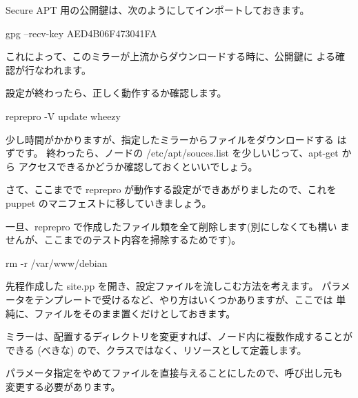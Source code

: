 \documentclass[mingoth,a4paper]{jsarticle}
\begin{document}
Secure APT 用の公開鍵は、次のようにしてインポートしておきます。

\begin{commandline}
gpg --recv-key AED4B06F473041FA
\end{commandline}

これによって、このミラーが上流からダウンロードする時に、公開鍵に
よる確認が行なわれます。

設定が終わったら、正しく動作するか確認します。

\begin{commandline}
reprepro -V update wheezy
\end{commandline}

少し時間がかかりますが、指定したミラーからファイルをダウンロードする
はずです。
終わったら、ノードの /etc/apt/souces.list を少しいじって、apt-get から
アクセスできるかどうか確認しておくといいでしょう。

さて、ここまでで reprepro が動作する設定ができあがりましたので、これを
puppet のマニフェストに移していきましょう。

一旦、reprepro で作成したファイル類を全て削除します(別にしなくても構い
ませんが、ここまでのテスト内容を掃除するためです)。

\begin{commandline}
rm -r /var/www/debian
\end{commandline}

先程作成した site.pp を開き、設定ファイルを流しこむ方法を考えます。
パラメータをテンプレートで受けるなど、やり方はいくつかありますが、ここでは
単純に、ファイルをそのまま置くだけとしておきます。

ミラーは、配置するディレクトリを変更すれば、ノード内に複数作成することが
できる (べきな) ので、クラスではなく、リソースとして定義します。



パラメータ指定をやめてファイルを直接与えることにしたので、呼び出し元も
変更する必要があります。
\end{document}
